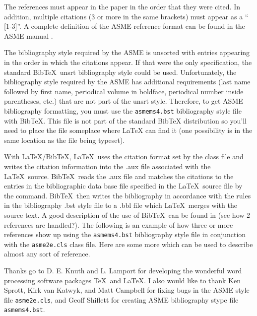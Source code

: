 \documentclass[twocolumn,10pt]{asme2e}
\begin{document}
The references must appear in the paper in the order that they were cited.
In addition, multiple citations (3 or more in the same brackets) must appear as a `` [1-3]''.
A complete definition of the ASME reference format can be found in the ASME manual \cite{asmemanual}.

The bibliography style required by the ASME is unsorted with entries appearing in the order in which the citations appear.
If that were the only specification, the standard {\sc Bib}\TeX\ unsrt bibliography style could be used.
Unfortunately, the bibliography style required by the ASME has additional requirements (last name followed by first name, periodical volume in boldface, periodical number inside parentheses, etc.) that are not part of the unsrt style.
Therefore, to get ASME bibliography formatting, you must use the \verb+asmems4.bst+ bibliography style file with {\sc Bib}\TeX. This file is not part of the standard BibTeX distribution so you'll need to place the file someplace where LaTeX can find it (one possibility is in the same location as the file being typeset).

With \LaTeX/{\sc Bib}\TeX, \LaTeX\ uses the citation format set by the class file and writes the citation information into the .aux file associated with the \LaTeX\ source.
{\sc Bib}\TeX\ reads the .aux file and matches the citations to the entries in the bibliographic data base file specified in the \LaTeX\ source file by the \verb++ command.
{\sc Bib}\TeX\ then writes the bibliography in accordance with the rules in the bibliography .bst style file to a .bbl file which \LaTeX\ merges with the source text.
A good description of the use of {\sc Bib}\TeX\ can be found in \cite{latex, goosens} (see how 2 references are handled?).
The following is an example of how three or more references \cite{latex, asmemanual, goosens} show up using the \verb+asmems4.bst+ bibliography style file in conjunction with the \verb+asme2e.cls+ class file.
Here are some more \cite{art, blt, ibk, icn, ips, mts, mis, pro, pts, trt, upd} which can be used to describe almost any sort of reference.




\begin{acknowledgment}
 Thanks go to D. E. Knuth and L. Lamport for developing the wonderful word processing software packages \TeX\ and \LaTeX. I also would like to thank Ken Sprott, Kirk van Katwyk, and Matt Campbell for fixing bugs in the ASME style file \verb+asme2e.cls+, and Geoff Shiflett for creating ASME bibliography stype file \verb+asmems4.bst+.
\end{acknowledgment}
\end{document}
